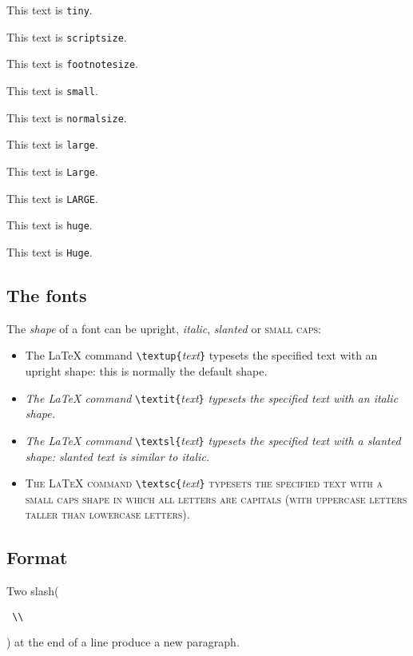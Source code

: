 {\tiny This text is \texttt{tiny}}.

{\scriptsize This text is \texttt{scriptsize}}.

{\footnotesize This text is \texttt{footnotesize}}.

{\small This text is \texttt{small}}.

{\normalsize This text is \texttt{normalsize}}.

{\large This text is \texttt{large}}.

{\Large This text is \texttt{Large}}.

{\LARGE This text is \texttt{LARGE}}.

{\huge This text is \texttt{huge}}.

{\Huge This text is \texttt{Huge}}.


\subsection{The fonts}

The \emph{shape} of a font can be \textup{upright},
\textit{italic}, \textsl{slanted} or \textsc{small caps}:
\begin{itemize}
\item
\textup{The LaTeX command}
   \verb/\textup{/\emph{text}\verb/}/
   \textup{typesets the specified text with an upright shape:
   this is normally the default shape.}
\item
\textit{The LaTeX command}
   \verb/\textit{/\emph{text}\verb/}/
   \textit{typesets the specified text with an italic shape.}
\item
\textsl{The LaTeX command}
   \verb/\textsl{/\emph{text}\verb/}/
   \textsl{typesets the specified text with a slanted shape:
   slanted text is similar to italic.}
\item
\textsc{The LaTeX command}
   \verb/\textsc{/\emph{text}\verb/}/
   \textsc{typesets the specified text with a small caps shape
   in which all letters are capitals (with uppercase letters taller than
   lowercase letters).}
\end{itemize}


\subsection{Format}

Two slash(\begin{verbatim} \\ \end{verbatim}) at the end of a line produce a new paragraph.

